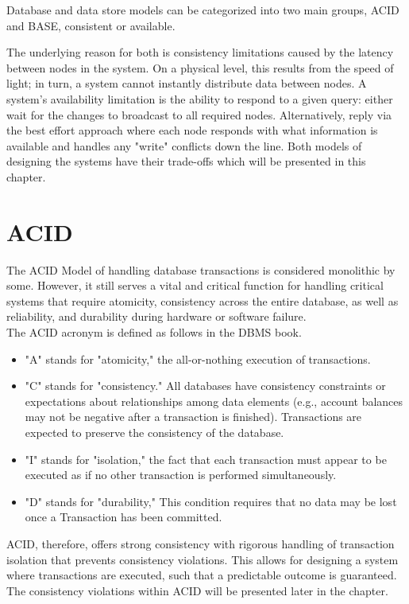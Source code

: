 \documentclass[a4paper,10pt,titlepage]{report}
\begin{document}
    Database and data store models can be categorized into two main groups, ACID and BASE, consistent or available.

    The underlying reason for both is consistency limitations caused by the latency between nodes in the system. On a physical level, this results from the speed of light; in turn, a system cannot instantly distribute data between nodes. A system's availability limitation is the ability to respond to a given query: either wait for the changes to broadcast to all required nodes. Alternatively, reply via the best effort approach where each node responds with what information is available and handles any "write" conflicts down the line. Both models of designing the systems have their trade-offs which will be presented in this chapter.


    \section{ACID}
    The ACID Model of handling database transactions is considered monolithic by some. However, it still serves a vital and critical function for handling critical systems that require atomicity, consistency across the entire database, as well as reliability, and durability during hardware or software failure.\\
    \vspace{5mm}
    The ACID acronym is defined as follows in the DBMS book\cite{DBMSbook}.

    \begin{itemize}
        \item "A" stands for "atomicity," the all-or-nothing execution of transactions.
        \item "C" stands for "consistency." All databases have consistency constraints or expectations about relationships among data elements (e.g., account balances may not be negative after a transaction is finished). Transactions are expected to preserve the consistency of the database.
        \item "I" stands for "isolation," the fact that each transaction must appear to be executed as if no other transaction is performed simultaneously.
        \item "D" stands for "durability," This condition requires that no data may be lost once a Transaction has been committed.
    \end{itemize}

    ACID, therefore, offers strong consistency with rigorous handling of transaction isolation that prevents consistency violations. This allows for designing a system where transactions are executed, such that a predictable outcome is guaranteed. The consistency violations within ACID will be presented later in the chapter.
\end{document}
